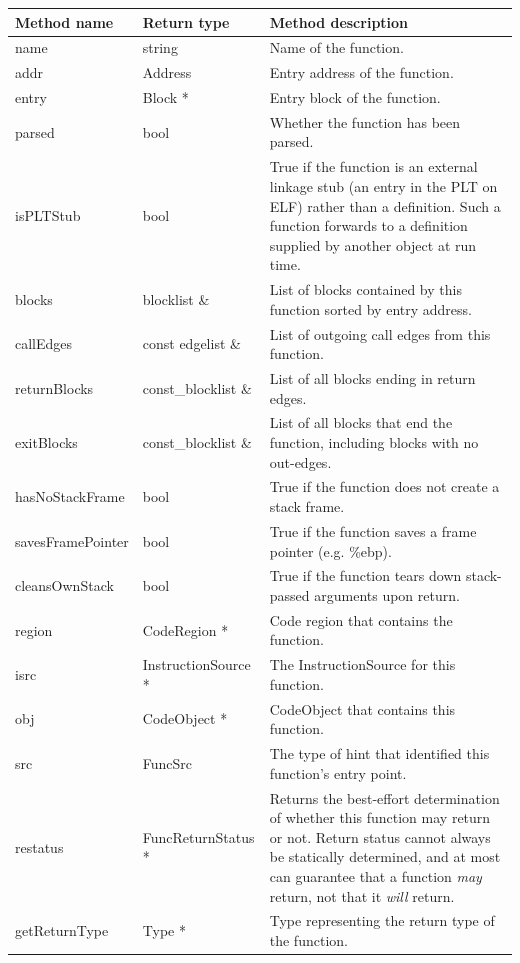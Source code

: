 \begin{tabular}{p{1.25in}p{1.125in}p{3.125in}}
\toprule
Method name & Return type & Method description \\
\midrule
name & string & Name of the function. \\
addr & Address & Entry address of the function.  \\
entry & Block * & Entry block of the function. \\
parsed & bool & Whether the function has been parsed. \\
isPLTStub & bool & True if the function is an external linkage stub (an entry in the PLT on ELF) rather than a definition. Such a function forwards to a definition supplied by another object at run time. \\
blocks & blocklist \& & List of blocks contained by this function sorted by entry address. \\
callEdges & const edgelist \& & List of outgoing call edges from this function. \\
returnBlocks & const\_blocklist \& & List of all blocks ending in return edges. \\
exitBlocks & const\_blocklist \& & List of all blocks that end the function, including blocks with no out-edges. \\
hasNoStackFrame & bool & True if the function does not create a stack frame. \\
savesFramePointer & bool & True if the function saves a frame pointer (e.g. \%ebp). \\
cleansOwnStack & bool & True if the function tears down stack-passed arguments upon return. \\
region & CodeRegion * & Code region that contains the function. \\
isrc & InstructionSource * & The InstructionSource for this function. \\
obj & CodeObject * & CodeObject that contains this function. \\
src & FuncSrc & The type of hint that identified this function's entry point. \\
restatus & FuncReturnStatus * & Returns the best-effort determination of whether this function may return or not. Return status cannot always be statically determined, and at most can guarantee that a function \emph{may} return, not that it \emph{will} return. \\
getReturnType & Type * & Type representing the return type of the function. \\

\bottomrule
\end{tabular}

